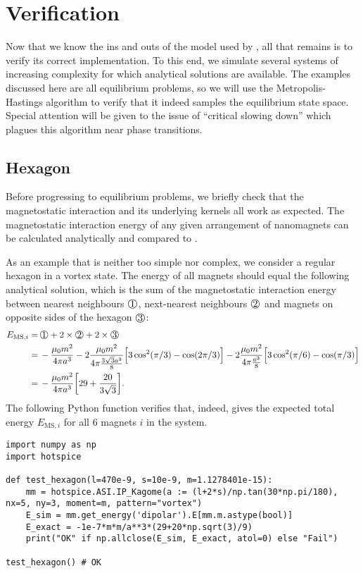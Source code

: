 \section{Verification} %
Now that we know the ins and outs of the model used by \hotspice, all that remains is to verify its correct implementation.
To this end, we simulate several systems of increasing complexity for which analytical solutions are available.
The examples discussed here are all equilibrium problems, so we will use the Metropolis-Hastings algorithm to verify that it indeed samples the equilibrium state space.
Special attention will be given to the issue of ``critical slowing down'' which plagues this algorithm near phase transitions.
\subsection{Hexagon}
Before progressing to equilibrium problems, we briefly check that the magnetostatic interaction and its underlying kernels all work as expected.
The magnetostatic interaction energy of any given arrangement of nanomagnets can be calculated analytically and compared to \hotspice. \par
As an example that is neither too simple nor complex, we consider a regular hexagon in a vortex state. The energy of all magnets should equal the following analytical solution, which is the sum of the magnetostatic interaction energy between nearest neighbours $\circled{1}$, next-nearest neighbours $\circled{2}$ and magnets on opposite sides of the hexagon $\circled{3}$:
\begin{align*}
	E_{\mathrm{MS},i} =&\, \circled{1} + 2 \times \circled{2} + 2 \times \circled{3} \\
	=&\, -\frac{\mu_0 m^2}{4\pi a^3} -2\frac{\mu_0 m^2}{4\pi \frac{3 \sqrt{3} a^3}{8}} \Big[3\cos^2(\pi/3) - \cos(2\pi/3)\Big] -2\frac{\mu_0 m^2}{4\pi \frac{a^3}{8}} \Big[3\cos^2(\pi/6) - \cos(\pi/3)\Big] \\
	=&\, -\frac{\mu_0 m^2}{4\pi a^3} \bigg[29+\frac{20}{3\sqrt{3}}\bigg] \mathrm{.}
\end{align*}
The following Python function verifies that, indeed, \hotspice gives the expected total energy $E_{\mathrm{MS},i}$ for all 6 magnets $i$ in the system.
\begin{lstlisting}
import numpy as np
import hotspice

def test_hexagon(l=470e-9, s=10e-9, m=1.1278401e-15):
	mm = hotspice.ASI.IP_Kagome(a := (l+2*s)/np.tan(30*np.pi/180), nx=5, ny=3, moment=m, pattern="vortex")
	E_sim = mm.get_energy('dipolar').E[mm.m.astype(bool)]
	E_exact = -1e-7*m*m/a**3*(29+20*np.sqrt(3)/9)
	print("OK" if np.allclose(E_sim, E_exact, atol=0) else "Fail")

test_hexagon() # OK
\end{lstlisting}

